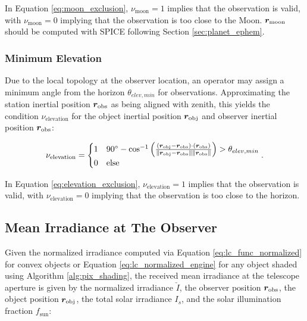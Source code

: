 In Equation \ref{eq:moon_exclusion}, $\nu_\mathrm{moon} = 1$ implies that the observation is valid, with $\nu_\mathrm{moon} = 0$ implying that the observation is too close to the Moon. $\bm{r}_\mathrm{moon}$ should be computed with SPICE following Section \ref{sec:planet_ephem}.

\subsubsection{Minimum Elevation}

Due to the local topology at the observer location, an operator may assign a minimum angle from the horizon $\theta_{elev,min}$ for observations. Approximating the station inertial position $\bm{r}_\mathrm{obs}$ as being aligned with zenith, this yields the condition $\nu_\mathrm{elevation}$ for the object inertial position $\bm{r}_\mathrm{obj}$ and observer inertial position $\bm{r}_\mathrm{obs}$:


\begin{equation} \label{eq:elevation_exclusion}
  \nu_\mathrm{elevation} = \begin{cases}
    1 & 90^\circ - \cos^{-1}\left( \frac{\left( \bm{r}_\mathrm{obj} - \bm{r}_\mathrm{obs} \right) \cdot \left( \bm{r}_\mathrm{obs} \right)}{\| \bm{r}_\mathrm{obj} - \bm{r}_\mathrm{obs} \| \| \bm{r}_\mathrm{obs} \|} \right) > \theta_{elev,min}\\
    0 & \mathrm{else}
  \end{cases}.
\end{equation}

In Equation \ref{eq:elevation_exclusion}, $\nu_\mathrm{elevation} = 1$ implies that the observation is valid, with $\nu_\mathrm{elevation} = 0$ implying that the observation is too close to the horizon.

\subsection{Mean Irradiance at The Observer}

Given the normalized irradiance computed via Equation \ref{eq:lc_func_normalized} for convex objects or Equation \ref{eq:lc_normalized_engine} for any object shaded using Algorithm \ref{alg:pix_shading}, the received mean irradiance at the telescope aperture is given by the normalized irradiance $\check{I}$, the observer position $\bm{r}_\mathrm{obs}$, the object position $\bm{r}_\mathrm{obj}$, the total solar irradiance $I_s$, and the solar illumination fraction $f_\mathrm{sun}$:

